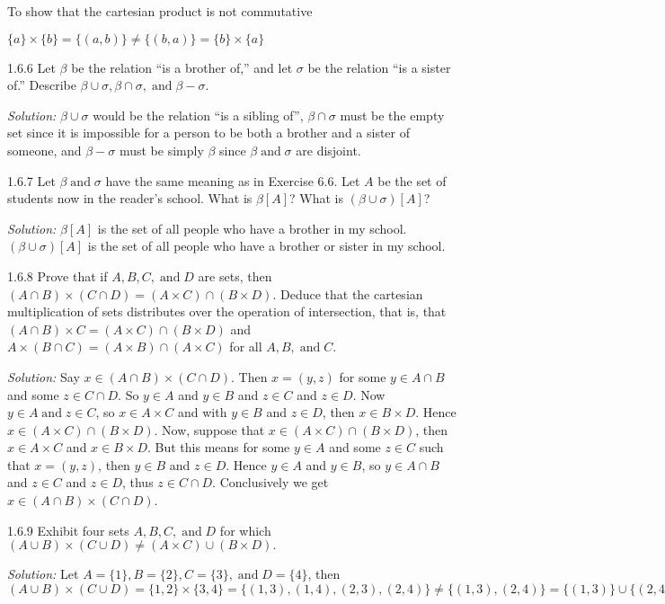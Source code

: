 \documentclass{letter}
\newcommand{\tmop}[1]{\ensuremath{\operatorname{#1}}}
\newcommand{\tmtextit}[1]{{\itshape{#1}}}
\begin{document}
To show that the cartesian product is not commutative

$\{a\} \times \{b\}=\{(a, b)\} \neq \{(b, a)\}=\{b\} \times \{a\}$

1.6.6 Let $\beta$ be the relation ``is a brother of,'' and let $\sigma$ be the
relation ``is a sister of.'' Describe $\beta \cup \sigma, \beta \cap \sigma,
\tmop{and} \beta - \sigma$.

\tmtextit{Solution:} $\beta \cup \sigma$ would be the relation ``is a sibling
of'', $\beta \cap \sigma$ must be the empty set since it is impossible for a
person to be both a brother and a sister of someone, and $\beta - \sigma$ must
be simply $\beta$ since $\beta \tmop{and} \sigma$ are disjoint.

1.6.7 Let $\beta \tmop{and} \sigma$ have the same meaning as in Exercise 6.6.
Let $A$ be the set of students now in the reader's school. What is $\beta
[A]$? What is $(\beta \cup \sigma) [A]$?

\tmtextit{Solution:} $\beta [A]$ is the set of all people who have a brother
in my school. $(\beta \cup \sigma) [A]$ is the set of all people who have a
brother or sister in my school.

1.6.8 Prove that if $A, B, C, \tmop{and} D$ are sets, then $(A \cap B) \times
(C \cap D) = (A \times C) \cap (B \times D) .$ Deduce that the cartesian
multiplication of sets distributes over the operation of intersection, that
is, that $(A \cap B) \times C = (A \times C) \cap (B \times D)$ and $A \times
(B \cap C) = (A \times B) \cap (A \times C)$ for all $A, B, \tmop{and} C.$

\tmtextit{Solution:} Say $x \in (A \cap B) \times (C \cap D)$. Then $x = (y,
z)$ for some $y \in A \cap B$ and some $z \in C \cap D$. So $y \in A$ and $y
\in B$ and $z \in C$ and $z \in D$. Now $y \in A \tmop{and} z \in C$, so $x
\in A \times C$ and with $y \in B$ and $z \in D$, then $x \in B \times D$.
Hence $x \in (A \times C) \cap (B \times D)$. Now, suppose that $x \in (A
\times C) \cap (B \times D)$, then $x \in A \times C$ and $x \in B \times D$.
But this means for some $y \in A$ and some $z \in C$ such that $x = (y, z)$,
then $y \in B$ and $z \in D$. Hence $y \in A$ and $y \in B$, so $y \in A \cap
B$ and $z \in C$ and $z \in D$, thus $z \in C \cap D$. Conclusively we get $x
\in (A \cap B) \times (C \cap D)$.

1.6.9 Exhibit four sets $A, B, C, \tmop{and} D$ for which $(A \cup B) \times
(C \cup D) \neq (A \times C) \cup (B \times D) .$

\tmtextit{Solution:} Let $A =\{1\}, B =\{2\}, C =\{3\}, \tmop{and} D =\{4\}$,
then $(A \cup B) \times (C \cup D) =\{1, 2\} \times \{3, 4\}=\{(1, 3), (1, 4),
(2, 3), (2, 4)\} \neq \{(1, 3), (2, 4)\}=\{(1, 3)\} \cup \{(2, 4)\}= (A \times
C) \cup (B \times D) .$
\end{document}
